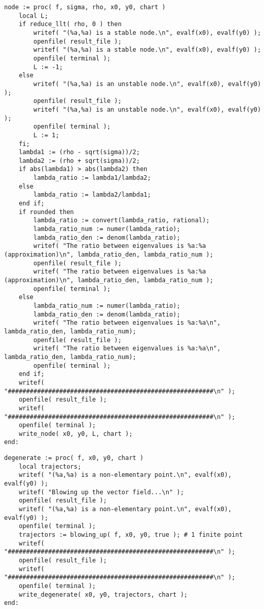 \documentclass[a4paper,10pt]{article}
\begin{document}
\begin{lstlisting}[name=type]
node := proc( f, sigma, rho, x0, y0, chart )
    local L;
    if reduce_llt( rho, 0 ) then
        writef( "(%a,%a) is a stable node.\n", evalf(x0), evalf(y0) );
        openfile( result_file );
        writef( "(%a,%a) is a stable node.\n", evalf(x0), evalf(y0) );
        openfile( terminal );
        L := -1;
    else
        writef( "(%a,%a) is an unstable node.\n", evalf(x0), evalf(y0) );
        openfile( result_file );
        writef( "(%a,%a) is an unstable node.\n", evalf(x0), evalf(y0) );
        openfile( terminal );
        L := 1;
    fi;
    lambda1 := (rho - sqrt(sigma))/2;
    lambda2 := (rho + sqrt(sigma))/2;
    if abs(lambda1) > abs(lambda2) then
        lambda_ratio := lambda1/lambda2;
    else
        lambda_ratio := lambda2/lambda1;
    end if;
    if rounded then
        lambda_ratio := convert(lambda_ratio, rational);
        lambda_ratio_num := numer(lambda_ratio);
        lambda_ratio_den := denom(lambda_ratio);
        writef( "The ratio between eigenvalues is %a:%a (approximation)\n", lambda_ratio_den, lambda_ratio_num );
        openfile( result_file );
        writef( "The ratio between eigenvalues is %a:%a (approximation)\n", lambda_ratio_den, lambda_ratio_num );
        openfile( terminal );
    else
        lambda_ratio_num := numer(lambda_ratio);
        lambda_ratio_den := denom(lambda_ratio);
        writef( "The ratio between eigenvalues is %a:%a\n", lambda_ratio_den, lambda_ratio_num);
        openfile( result_file );
        writef( "The ratio between eigenvalues is %a:%a\n", lambda_ratio_den, lambda_ratio_num);
        openfile( terminal );
    end if;
    writef( "########################################################\n" );
    openfile( result_file );
    writef( "########################################################\n" );
    openfile( terminal );
    write_node( x0, y0, L, chart );
end:
\end{lstlisting}

\begin{lstlisting}[name=type]
degenerate := proc( f, x0, y0, chart )
    local trajectors;
    writef( "(%a,%a) is a non-elementary point.\n", evalf(x0), evalf(y0) );
    writef( "Blowing up the vector field...\n" );
    openfile( result_file );
    writef( "(%a,%a) is a non-elementary point.\n", evalf(x0), evalf(y0) );
    openfile( terminal );
    trajectors := blowing_up( f, x0, y0, true ); # 1 finite point
    writef( "########################################################\n" );
    openfile( result_file );
    writef( "########################################################\n" );
    openfile( terminal );
    write_degenerate( x0, y0, trajectors, chart );
end:
\end{lstlisting}
\end{document}

